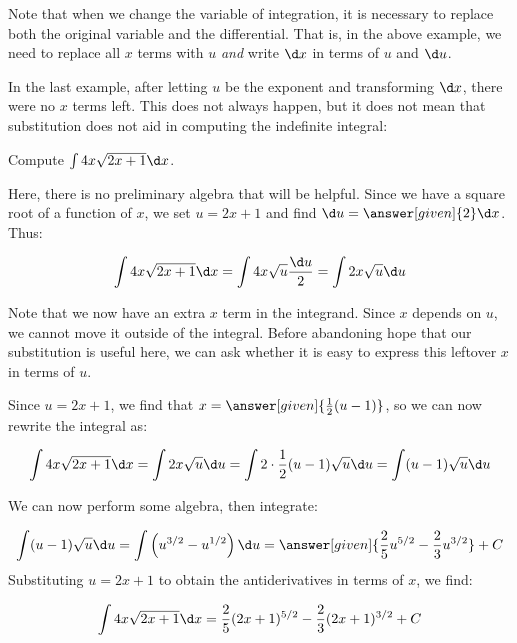 \documentclass[nooutcomes]{ximera}
\begin{document}
\begin{remark}
Note that when we change the variable of integration, it is necessary to replace both the original variable and the differential.  That is, in the above example, we need to replace all $x$ terms with $u$ \emph{and} write $\d x$ in terms of $u$ and $\d u$. 
\end{remark}

In the last example, after letting $u$ be the exponent and transforming $\d x$, there were no $x$ terms left.  This does not always happen, but it does not mean that substitution does not aid in computing the indefinite integral:

\begin{example}
Compute $\int 4x \sqrt{2x+1} \d x$.

\begin{explanation}
Here, there is no preliminary algebra that will be helpful.  Since we have a square root of a function of $x$, we set $u=2x+1$ and find $\d u = \answer[given]{2} \d x$.  Thus:

\[
\int 4x \sqrt{2x+1} \d x = \int 4x \sqrt{u} \frac{\d u}{2} =  \int 2x \sqrt{u} \d u
\]

Note that we now have an extra $x$ term in the integrand.  Since $x$ depends on $u$, we cannot move it outside of the integral.  Before abandoning hope that our substitution is useful here, we can ask whether it is easy to express this leftover $x$ in terms of $u$.  

Since $u= 2x+1$, we find that $x = \answer[given]{\frac{1}{2}(u-1)}$, so we can now rewrite the integral as:

\[
\int 4x \sqrt{2x+1} \d x =  \int 2x \sqrt{u} \d u = \int 2 \cdot \frac{1}{2}(u-1) \sqrt{u} \d u = \int (u-1)\sqrt{u} \d u
\]

We can now perform some algebra, then integrate:

\[
 \int (u-1)\sqrt{u} \d u = \int \left(u^{3/2} - u^{1/2} \right) \d u = \answer[given]{\frac{2}{5} u^{5/2} - \frac{2}{3} u^{3/2}} +C
\]
Substituting $u=2x+1$ to obtain the antiderivatives in terms of $x$, we find:

\[
\int 4x \sqrt{2x+1} \d x =  \frac{2}{5} (2x+1)^{5/2} - \frac{2}{3} (2x+1)^{3/2} +C
\]
\end{explanation}
\end{example}
\end{document}
